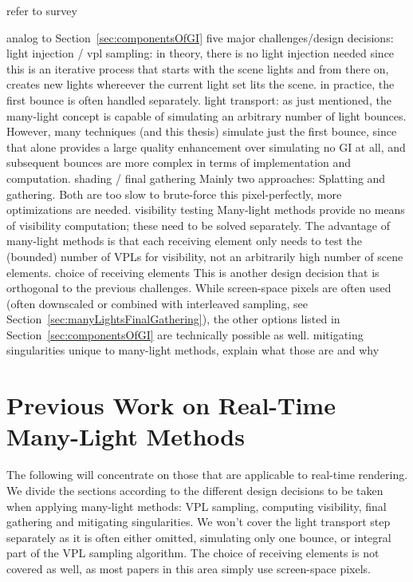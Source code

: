 \begin{outline}

\1 refer to survey \cite{Dachsbacher:2014:ManyLightsSTAR}

\1 analog to Section~\ref{sec:componentsOfGI} five major challenges/design decisions:
    \2 light injection / vpl sampling:
        \3 in theory, there is no light injection needed since this is an iterative process that starts with the scene lights and from there on, creates new lights whereever the current light set lits the scene. in practice, the first bounce is often handled separately.
    \2 light transport: as just mentioned, the many-light concept is capable of simulating an arbitrary number of light bounces. However, many techniques (and this thesis) simulate just the first bounce, since that alone provides a large quality enhancement over simulating no GI at all, and subsequent bounces are more complex in terms of implementation and computation.
    \2 shading / final gathering
        \3 Mainly two approaches: Splatting and gathering. Both are too slow to brute-force this pixel-perfectly, more optimizations are needed.
    \2 visibility testing
        \3 Many-light methods provide no means of visibility computation; these need to be solved separately.  The advantage of many-light methods is that each receiving element only needs to test the (bounded) number of VPLs for visibility, not an arbitrarily high number of scene elements.
    \2 choice of receiving elements
        \3 This is another design decision that is orthogonal to the previous challenges. While screen-space pixels are often used (often downscaled or combined with interleaved sampling, see Section~\ref{sec:manyLightsFinalGathering}), the other options listed in Section~\ref{sec:componentsOfGI} are technically possible as well.
    \2 mitigating singularities
        \3 unique to many-light methods, explain what those are and why

\end{outline}



\section{Previous Work on Real-Time Many-Light Methods}

The following will concentrate on those that are applicable to real-time rendering. We divide the sections according to the different design decisions to be taken when applying many-light methods: VPL sampling, computing visibility, final gathering and mitigating singularities. We won't cover the light transport step separately as it is often either omitted, simulating only one bounce, or integral part of the VPL sampling algorithm. The choice of receiving elements is not covered as well, as most papers in this area simply use screen-space pixels.

